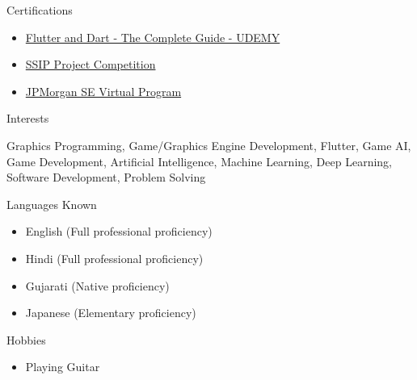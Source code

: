 \documentclass{resume} %
\begin{document}
\begin{rSection}{Certifications} 
\begin{itemize}
    \item   \href{https://www.udemy.com/certificate/UC-2fce7723-1cc7-403d-a54b-09dbd5cd495e/}{Flutter and Dart - The Complete Guide - UDEMY}
    \item   \href{https://jaynakum.github.io/assets/Achievements/SSIP.jpg}{SSIP Project Competition}
    \item   \href{https://jaynakum.github.io/assets/Achievements/JPMC.jpg}{JPMorgan SE Virtual Program}
\end{itemize}
\end{rSection}

\begin{rSection}{Interests} 
\begin{itemize}
    Graphics Programming, Game/Graphics Engine Development, Flutter, Game AI, Game Development, Artificial Intelligence, Machine Learning, Deep Learning, Software Development, Problem Solving
\end{itemize}
\end{rSection}

\begin{rSection}{Languages Known} 
\begin{itemize}
    \item English (Full professional proficiency)
    \item Hindi (Full professional proficiency)
    \item Gujarati (Native proficiency)
    \item Japanese (Elementary proficiency)
\end{itemize}
\end{rSection}

\begin{rSection}{Hobbies} 
\begin{itemize}
    \item Playing Guitar
\end{itemize}
\end{rSection}
\end{document}
